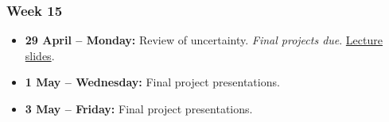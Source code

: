 \documentclass[a4paper,12pt]{article}
\begin{document}
\subsubsection*{Week 15}

\begin{itemize}
	\item \textbf{29 April -- Monday:} Review of uncertainty. \textit{Final projects due}. \href{https://pols1600.github.io/slides/week14a/week14a.html}{Lecture slides}.
	\item \textbf{1 May -- Wednesday:} Final project presentations.
	\item \textbf{3 May -- Friday:} Final project presentations. 
\end{itemize}
\end{document}
